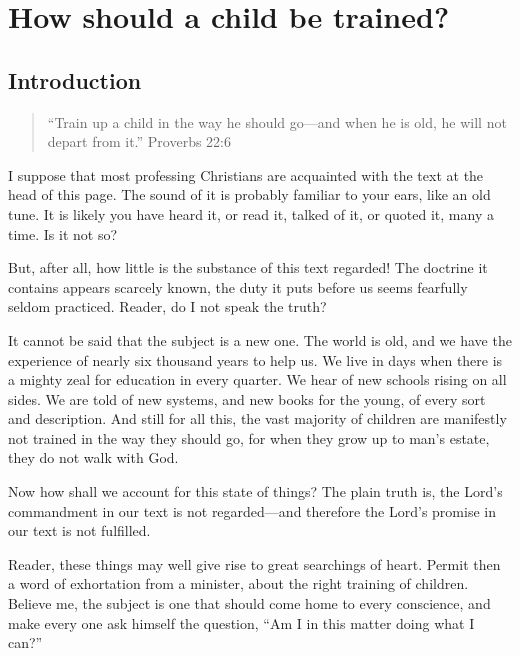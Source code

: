 \documentclass[
]{book}
\begin{document}
\hypertarget{how-should-a-child-be-trained}{%
\chapter*{How should a child be trained?}\label{how-should-a-child-be-trained}}

\hypertarget{introduction}{%
\section*{Introduction}\label{introduction}}

\begin{quote}
``Train up a child in the way he should go---and when he is old, he will not depart from it.'' Proverbs 22:6
\end{quote}

I suppose that most professing Christians are acquainted with the text at the head of this page. The sound of it is probably familiar to your ears, like an old tune. It is likely you have heard it, or read it, talked of it, or quoted it, many a time. Is it not so?

But, after all, how little is the substance of this text regarded! The doctrine it contains appears scarcely known, the duty it puts before us seems fearfully seldom practiced. Reader, do I not speak the truth?

It cannot be said that the subject is a new one. The world is old, and we have the experience of nearly six thousand years to help us. We live in days when there is a mighty zeal for education in every quarter. We hear of new schools rising on all sides. We are told of new systems, and new books for the young, of every sort and description. And still for all this, the vast majority of children are manifestly not trained in the way they should go, for when they grow up to man's estate, they do not walk with God.

Now how shall we account for this state of things? The plain truth is, the Lord's commandment in our text is not regarded---and therefore the Lord's promise in our text is not fulfilled.

Reader, these things may well give rise to great searchings of heart. Permit then a word of exhortation from a minister, about the right training of children. Believe me, the subject is one that should come home to every conscience, and make every one ask himself the question, ``Am I in this matter doing what I can?''
\end{document}
